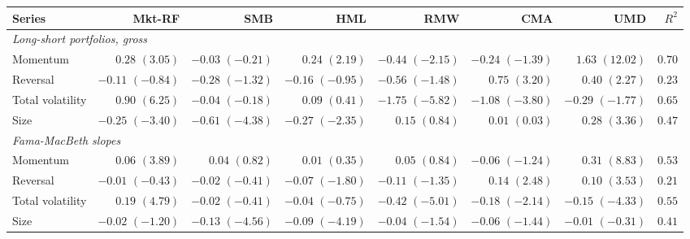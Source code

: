 \begin{tabular}{lrrrrrrr}
\toprule
Series & Mkt-RF & SMB & HML & RMW & CMA & UMD & $R^2$ \\
\midrule
\multicolumn{8}{l}{\textit{Long-short portfolios, gross}} \\
Momentum & $0.28$ $(3.05)$ & $-0.03$ $(-0.21)$ & $0.24$ $(2.19)$ & $-0.44$ $(-2.15)$ & $-0.24$ $(-1.39)$ & $1.63$ $(12.02)$ & $0.70$ \\
Reversal & $-0.11$ $(-0.84)$ & $-0.28$ $(-1.32)$ & $-0.16$ $(-0.95)$ & $-0.56$ $(-1.48)$ & $0.75$ $(3.20)$ & $0.40$ $(2.27)$ & $0.23$ \\
Total volatility & $0.90$ $(6.25)$ & $-0.04$ $(-0.18)$ & $0.09$ $(0.41)$ & $-1.75$ $(-5.82)$ & $-1.08$ $(-3.80)$ & $-0.29$ $(-1.77)$ & $0.65$ \\
Size & $-0.25$ $(-3.40)$ & $-0.61$ $(-4.38)$ & $-0.27$ $(-2.35)$ & $0.15$ $(0.84)$ & $0.01$ $(0.03)$ & $0.28$ $(3.36)$ & $0.47$ \\
\multicolumn{8}{l}{\textit{Fama-MacBeth slopes}} \\
Momentum & $0.06$ $(3.89)$ & $0.04$ $(0.82)$ & $0.01$ $(0.35)$ & $0.05$ $(0.84)$ & $-0.06$ $(-1.24)$ & $0.31$ $(8.83)$ & $0.53$ \\
Reversal & $-0.01$ $(-0.43)$ & $-0.02$ $(-0.41)$ & $-0.07$ $(-1.80)$ & $-0.11$ $(-1.35)$ & $0.14$ $(2.48)$ & $0.10$ $(3.53)$ & $0.21$ \\
Total volatility & $0.19$ $(4.79)$ & $-0.02$ $(-0.41)$ & $-0.04$ $(-0.75)$ & $-0.42$ $(-5.01)$ & $-0.18$ $(-2.14)$ & $-0.15$ $(-4.33)$ & $0.55$ \\
Size & $-0.02$ $(-1.20)$ & $-0.13$ $(-4.56)$ & $-0.09$ $(-4.19)$ & $-0.04$ $(-1.54)$ & $-0.06$ $(-1.44)$ & $-0.01$ $(-0.31)$ & $0.41$ \\
\bottomrule
\end{tabular}

